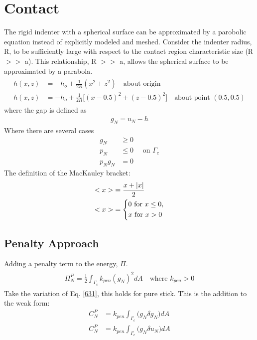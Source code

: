 \documentclass[12pt,3p]{article}
\begin{document}
\section{Contact}
The rigid indenter with a spherical surface can be approximated by a parobolic equation instead of explicitly modeled and meshed. Consider the indenter radius, R, to be sufficiently large with respect to the contact region characteristic size (R $>>$ a). This relationship, R $>>$ a, allows the spherical surface to be approximated by a parabola.
\begin{align}\label{Indenter}
\begin{split}
h(x,z) &= - h_o + \frac{1}{2 R}(x^2 + z^2) \quad \text{about origin} \\
h(x, z) &= - h_o + \frac{1}{2 R}\big[ (x - 0.5)^2 + (z-0.5)^2 \big] \quad \text{about point } (0.5, 0.5)
\end{split}
\end{align}
where the gap is defined as 
\begin{align*}
g_N = u_N - h
\end{align*}
Where there are several cases 
\begin{equation}
\begin{aligned}
g_N & \geq 0 \\
p_N & \leq 0 \quad \text { on } \Gamma_{c} \\
p_N g_N &=0
\end{aligned}
\end{equation}
The definition of the MacKauley bracket:
\begin{align}\label{MacKauley}
\begin{split}
<x> &= \frac{x + |x|}{2} \\
<x> &= 
\begin{dcases}
    0 \text{ for } x \leq 0, \\
    x \text{ for } x > 0
\end{dcases}
\end{split}
\end{align}

\subsection{Penalty Approach}
Adding a penalty term to the energy, $\Pi$.
\begin{align}\label{631}
\begin{split}
\Pi_N^P = \frac{1}{2} \int_{\Gamma_c} k_{pen} (g_{N})^2 dA \quad \text{where } k_{pen} > 0 
\end{split}
\end{align}
Take the variation of Eq. \ref{631}, this holds for pure stick. This is the addition to the weak form: 
\begin{align*}
C_N^P &= k_{pen} \int_{\Gamma_c} \big( g_{N} \delta g_{N} \big) dA \\
C_N^P &=  k_{pen} \int_{\Gamma_c} \big( g_{N} \delta u_{N} \big) dA
\end{align*}
\end{document}
